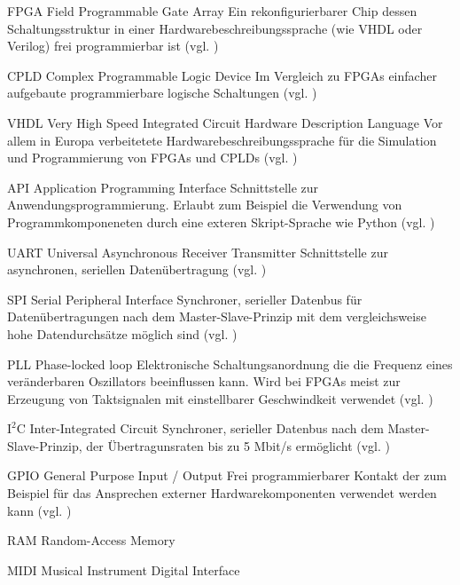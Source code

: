 
	{FPGA}
	{Field Programmable Gate Array}
	{Ein rekonfigurierbarer Chip dessen Schaltungsstruktur in einer Hardwarebeschreibungssprache (wie VHDL oder Verilog) frei programmierbar ist (vgl. \cite{wiki:FPGA})} 

	{CPLD}
	{Complex Programmable Logic Device}
	{Im Vergleich zu FPGAs einfacher aufgebaute programmierbare logische Schaltungen (vgl. \cite{wiki:CPLD})}

	{VHDL}
	{Very High Speed Integrated Circuit Hardware Description Language}
	{Vor allem in Europa verbeitetete Hardwarebeschreibungssprache für die Simulation und Programmierung von FPGAs und CPLDs (vgl. \cite{wiki:VHDL})}


	{API}
	{Application Programming Interface}
	{Schnittstelle zur Anwendungsprogrammierung. Erlaubt zum Beispiel die Verwendung von Programmkomponeneten durch eine exteren Skript-Sprache wie Python (vgl. \cite{wiki:API})}

	{UART}
	{Universal Asynchronous Receiver Transmitter}
	{Schnittstelle zur asynchronen, seriellen Datenübertragung (vgl. \cite{wiki:UART})}


	{SPI}
	{Serial Peripheral Interface}
	{Synchroner, serieller Datenbus für Datenübertragungen nach dem Master-Slave-Prinzip mit dem vergleichsweise hohe Datendurchsätze möglich sind (vgl. \cite{wiki:SPI})}


	{PLL}
	{Phase-locked loop}
	{Elektronische Schaltungsanordnung die die Frequenz eines veränderbaren Oszillators beeinflussen kann. Wird bei FPGAs meist zur Erzeugung von Taktsignalen mit einstellbarer Geschwindkeit verwendet (vgl. \cite{wiki:PLL})}

	{$\text{I}^2$C}
	{Inter-Integrated Circuit}
	{Synchroner, serieller Datenbus nach dem Master-Slave-Prinzip, der Übertragunsraten bis zu 5 Mbit/s ermöglicht (vgl. \cite{wiki:I2C})}

	{GPIO}
	{General Purpose Input / Output}
	{Frei programmierbarer Kontakt der zum Beispiel für das Ansprechen externer Hardwarekomponenten verwendet werden kann (vgl. \cite{wiki:GPIO})}




	{RAM}
	{Random-Access Memory} 

	{MIDI}
	{Musical Instrument Digital Interface} 







